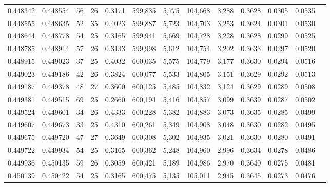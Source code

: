 \begin{tabular}{rrrrrrrrrrrrr}
0.448342 & 0.448554 &    56 &  26 &                                     0.3171 & 599,835 &   5,775 & 104,668 &   3,288 & 0.3628 & 0.0305 & 0.0535 \\
0.448555 & 0.448635 &    52 &  35 &                                     0.4023 & 599,887 &   5,723 & 104,703 &   3,253 & 0.3624 & 0.0301 & 0.0530 \\
0.448644 & 0.448778 &    54 &  25 &                                     0.3165 & 599,941 &   5,669 & 104,728 &   3,228 & 0.3628 & 0.0299 & 0.0525 \\
0.448785 & 0.448914 &    57 &  26 &                                     0.3133 & 599,998 &   5,612 & 104,754 &   3,202 & 0.3633 & 0.0297 & 0.0520 \\
0.448915 & 0.449023 &    37 &  25 &                                     0.4032 & 600,035 &   5,575 & 104,779 &   3,177 & 0.3630 & 0.0294 & 0.0516 \\
0.449023 & 0.449186 &    42 &  26 &                                     0.3824 & 600,077 &   5,533 & 104,805 &   3,151 & 0.3629 & 0.0292 & 0.0513 \\
0.449187 & 0.449378 &    48 &  27 &                                     0.3600 & 600,125 &   5,485 & 104,832 &   3,124 & 0.3629 & 0.0289 & 0.0508 \\
0.449381 & 0.449515 &    69 &  25 &                                     0.2660 & 600,194 &   5,416 & 104,857 &   3,099 & 0.3639 & 0.0287 & 0.0502 \\
0.449524 & 0.449601 &    34 &  26 &                                     0.4333 & 600,228 &   5,382 & 104,883 &   3,073 & 0.3635 & 0.0285 & 0.0499 \\
0.449607 & 0.449673 &    33 &  25 &                                     0.4310 & 600,261 &   5,349 & 104,908 &   3,048 & 0.3630 & 0.0282 & 0.0495 \\
0.449675 & 0.449720 &    47 &  27 &                                     0.3649 & 600,308 &   5,302 & 104,935 &   3,021 & 0.3630 & 0.0280 & 0.0491 \\
0.449722 & 0.449934 &    54 &  25 &                                     0.3165 & 600,362 &   5,248 & 104,960 &   2,996 & 0.3634 & 0.0278 & 0.0486 \\
0.449936 & 0.450135 &    59 &  26 &                                     0.3059 & 600,421 &   5,189 & 104,986 &   2,970 & 0.3640 & 0.0275 & 0.0481 \\
0.450139 & 0.450422 &    54 &  25 &                                     0.3165 & 600,475 &   5,135 & 105,011 &   2,945 & 0.3645 & 0.0273 & 0.0476 \\

\end{tabular}
